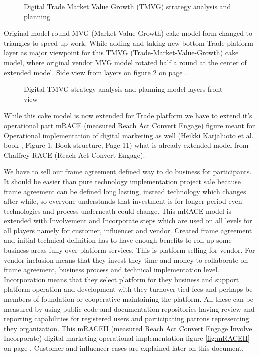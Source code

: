 \begin{figure} %
 \begin{center}
  \caption{Digital Trade Market Value Growth (TMVG) strategy analysis and planning}
  \label{fig:TradeMarketValueGrowth}
 \end{center}
\end{figure}

Original model round MVG (Market-Value-Growth) cake model form changed to triangles to speed up work. While adding and taking new bottom Trade platform layer as major viewpoint for this TMVG (Trade-Market-Value-Growth) cake model, where original vendor MVG model rotated half a round at the center of extended model. Side view from layers on figure \ref{fig:TradeMarketValueGrowthLayers} on page \pageref{fig:TradeMarketValueGrowthLayers}.
\begin{figure} %
 \begin{center}
  \caption{Digital TMVG strategy analysis and planning model layers front view}
  \label{fig:TradeMarketValueGrowthLayers}
 \end{center}
\end{figure}
While this cake model is now extended for Trade platform we have to extend it's operational part mRACE \cite{SDM2022} (measured Reach Act Convert Engage) figure meant for Operational implementation of digital marketing as well (Heikki Karjaluoto et al. book \cite{Karjaluoto2022}, Figure 1: Book structure, Page 11) what is already extended model from Chaffrey RACE \cite{ChaffreyRACE} (Reach Act Convert Engage).

We have to sell our frame agreement defined way to do business for participants. It should be easier than pure technology implementation project sale because frame agreement can be defined long lasting, instead technology which changes after while, so everyone understands that investment is for longer period even technologies and process underneath could change. This mRACE model is extended with Involvement and Incorporate steps which are used on all levels for all players namely for customer, influencer and vendor. Created frame agreement and initial technical definition has to have enough benefits to roll up some business areas fully over platform services. This is platform selling for vendor. For vendor inclusion means that they invest they time and money to collaborate on frame agreement, business process and technical implementation level. Incorporation means that they select platform for they business and support platform operation and development with they turnover tied fees and perhaps be members of foundation or cooperative maintaining the platform. All these can be measured by using public code and documentation repositories having review and reporting capabilities for registered users and participating patrons representing they organization. This mRACEII (measured Reach Act Convert Engage Involve Incorporate) digital marketing operational implementation figure \ref{fig:mRACEII} on page \pageref{fig:mRACEII}. Customer and influencer cases are explained later on this document.

